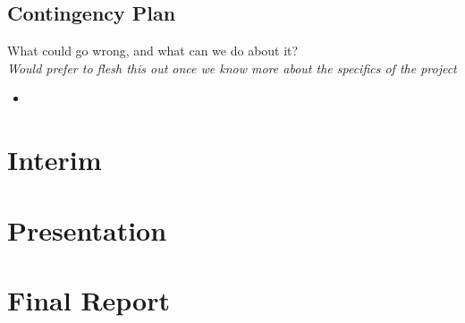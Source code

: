 \documentclass[12pt]{article}
\begin{document}
\subsection{Contingency Plan}

What could go wrong, and what can we do about it?\\
\textit{Would prefer to flesh this out once we know more about the specifics of the project}
\begin{itemize}
\item
\end{itemize}


\section{Interim}

\section{Presentation}

\section{Final Report}
\end{document}
